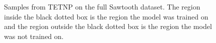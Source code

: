 \documentclass[../../main.tex]{subfiles}
\begin{document}
\begin{figure}[H]
    \centering
    \caption{Samples from TETNP on the full Sawtooth dataset. The region inside the black dotted box is the region the model was trained on and the region outside the black dotted box is the region the model was not trained on.}
    \label{fig:full-saw-preds}
\end{figure}


\end{document}
